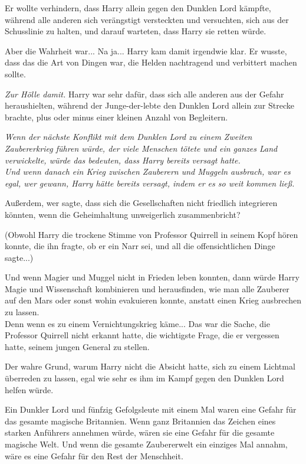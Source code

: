 {Er wollte verhindern, dass Harry allein gegen den Dunklen Lord kämpfte, während alle anderen sich verängstigt versteckten und versuchten, sich aus der Schusslinie zu halten, und darauf warteten, dass Harry sie retten würde.

Aber die Wahrheit war... Na ja... Harry kam damit irgendwie klar. Er wusste, dass das die Art von Dingen war, die Helden nachtragend und verbittert machen sollte.

\emph{Zur Hölle damit.} Harry war sehr dafür, dass sich alle anderen aus der Gefahr heraushielten, während der Junge-der-lebte den Dunklen Lord allein zur Strecke brachte, plus oder minus einer kleinen Anzahl von Begleitern.

\emph{Wenn der nächste Konflikt mit dem Dunklen Lord zu einem Zweiten Zaubererkrieg führen würde, der viele Menschen tötete und ein ganzes Land verwickelte, würde das bedeuten, dass Harry bereits versagt hatte.}\\ \emph{\hfill\break Und wenn danach ein Krieg zwischen Zauberern und Muggeln ausbrach, war es egal, wer gewann, Harry hätte bereits versagt, indem er es so weit kommen ließ.}

Außerdem, wer sagte, dass sich die Gesellschaften nicht friedlich integrieren könnten, wenn die Geheimhaltung unweigerlich zusammenbricht?

(Obwohl Harry die trockene Stimme von Professor Quirrell in seinem Kopf hören konnte, die ihn fragte, ob er ein Narr sei, und all die offensichtlichen Dinge sagte...)

Und wenn Magier und Muggel nicht in Frieden leben konnten, dann würde Harry Magie und Wissenschaft kombinieren und herausfinden, wie man alle Zauberer auf den Mars oder sonst wohin evakuieren konnte, anstatt einen Krieg ausbrechen zu lassen.\\ Denn wenn es zu einem Vernichtungskrieg käme... Das war die Sache, die Professor Quirrell nicht erkannt hatte, die wichtigste Frage, die er vergessen hatte, seinem jungen General zu stellen.

Der wahre Grund, warum Harry nicht die Absicht hatte, sich zu einem Lichtmal überreden zu lassen, egal wie sehr es ihm im Kampf gegen den Dunklen Lord helfen würde.

Ein Dunkler Lord und fünfzig Gefolgsleute mit einem Mal waren eine Gefahr für das gesamte magische Britannien. Wenn ganz Britannien das Zeichen eines starken Anführers annehmen würde, wären sie eine Gefahr für die gesamte magische Welt. Und wenn die gesamte Zaubererwelt ein einziges Mal annahm, wäre es eine Gefahr für den Rest der Menschheit.

}

